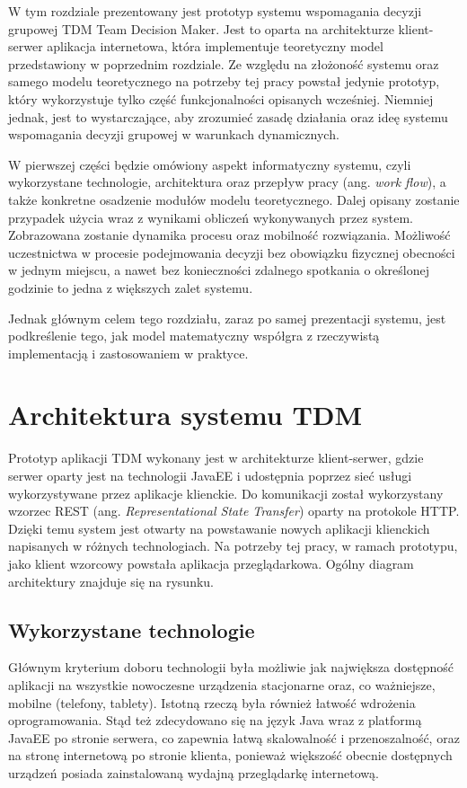 W tym rozdziale prezentowany jest prototyp systemu wspomagania decyzji grupowej
TDM Team Decision Maker. Jest to oparta na architekturze klient-serwer
aplikacja internetowa, która implementuje teoretyczny model przedstawiony w
poprzednim rozdziale. Ze względu na złożoność systemu oraz samego modelu
teoretycznego na potrzeby tej pracy powstał jedynie prototyp, który wykorzystuje
tylko część funkcjonalności opisanych wcześniej. Niemniej jednak, jest to
wystarczające, aby zrozumieć zasadę działania oraz ideę systemu wspomagania
decyzji grupowej w warunkach dynamicznych.

W pierwszej części będzie omówiony aspekt informatyczny systemu,
czyli wykorzystane technologie, architektura oraz przepływ pracy (ang.
\textit{work flow}), a także konkretne osadzenie modułów modelu teoretycznego.
Dalej opisany zostanie przypadek użycia wraz z wynikami obliczeń
wykonywanych przez system. Zobrazowana zostanie dynamika procesu oraz mobilność
rozwiązania. Możliwość uczestnictwa w procesie podejmowania decyzji bez
obowiązku fizycznej obecności w jednym miejscu, a nawet bez konieczności
zdalnego spotkania o określonej godzinie to jedna z większych zalet systemu.

Jednak głównym celem tego rozdziału, zaraz po samej prezentacji systemu, jest
podkreślenie tego, jak model matematyczny współgra z rzeczywistą implementacją i
zastosowaniem w praktyce. 

\section{Architektura systemu TDM}
Prototyp aplikacji TDM wykonany jest w architekturze klient-serwer, gdzie serwer
oparty jest na technologii JavaEE i udostępnia poprzez sieć usługi
wykorzystywane przez aplikacje klienckie. Do komunikacji został wykorzystany
wzorzec REST (ang. \textit{Representational State Transfer}) oparty na protokole
HTTP. Dzięki temu system jest otwarty na powstawanie nowych aplikacji klienckich
napisanych w różnych technologiach. Na potrzeby tej pracy, w ramach prototypu,
jako klient wzorcowy powstała aplikacja przeglądarkowa. Ogólny diagram
architektury znajduje się na rysunku.

\subsection{Wykorzystane technologie}
Głównym kryterium doboru technologii była możliwie jak największa dostępność
aplikacji na wszystkie nowoczesne urządzenia stacjonarne oraz, co ważniejsze,
mobilne (telefony, tablety). Istotną rzeczą była również łatwość wdrożenia
oprogramowania. Stąd też zdecydowano się na język Java wraz z platformą JavaEE
po stronie serwera, co zapewnia łatwą skalowalność i przenoszalność, oraz
na stronę internetową po stronie klienta, ponieważ większość obecnie dostępnych
urządzeń posiada zainstalowaną wydajną przeglądarkę internetową.


